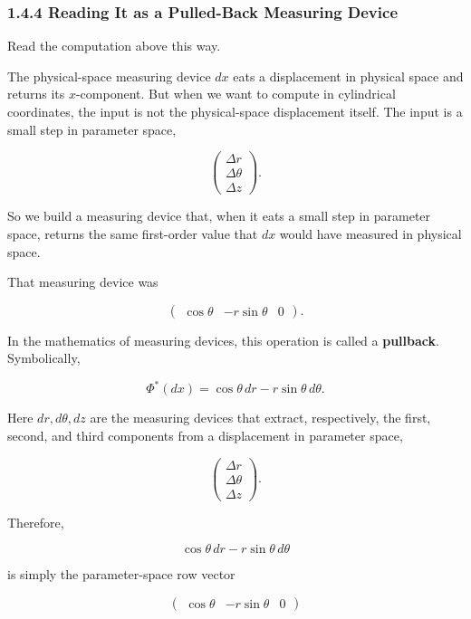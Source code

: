 \hypertarget{reading-it-as-a-pulled-back-measuring-device}{%
\subsubsection{1.4.4 Reading It as a Pulled-Back Measuring
Device}\label{reading-it-as-a-pulled-back-measuring-device}}

Read the computation above this way.

The physical-space measuring device \(dx\) eats a displacement in
physical space and returns its \(x\)-component. But when we want to
compute in cylindrical coordinates, the input is not the physical-space
displacement itself. The input is a small step in parameter space,

\[
\begin{pmatrix}
\Delta r\\
\Delta\theta\\
\Delta z
\end{pmatrix}.
\]

So we build a measuring device that, when it eats a small step in
parameter space, returns the same first-order value that \(dx\) would
have measured in physical space.

That measuring device was

\[
\begin{pmatrix}
\cos\theta & -r\sin\theta & 0
\end{pmatrix}.
\]

In the mathematics of measuring devices, this operation is called a
\textbf{pullback}. Symbolically,

\[
\Phi^*(dx)
=
\cos\theta\,dr-r\sin\theta\,d\theta.
\]

Here \(dr,d\theta,dz\) are the measuring devices that extract,
respectively, the first, second, and third components from a
displacement in parameter space,

\[
\begin{pmatrix}
\Delta r\\
\Delta\theta\\
\Delta z
\end{pmatrix}.
\]

Therefore,

\[
\cos\theta\,dr-r\sin\theta\,d\theta
\]

is simply the parameter-space row vector

\[
\begin{pmatrix}
\cos\theta & -r\sin\theta & 0
\end{pmatrix}
\]

